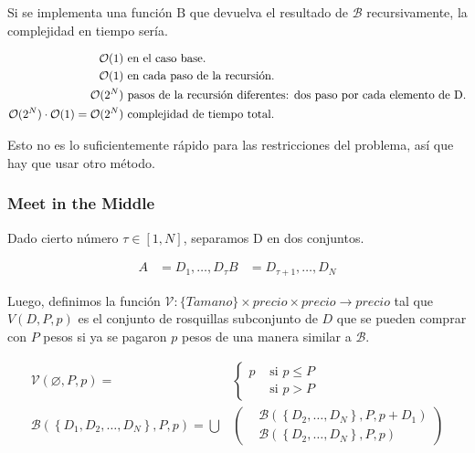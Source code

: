 Si se implementa una función \( \mathrm{B} \) que devuelva el resultado de \( \mathcal{B} \) recursivamente, la complejidad en tiempo sería.

\begin{align*}
	\mathcal{O}(1) & \text{ en el caso base.} \\
	\mathcal{O}(1) & \text{ en cada paso de la recursión.} \\
	\mathcal{O}(2^N) & \text{ pasos de la recursión diferentes: dos paso por cada elemento de D.} \\
	\mathcal{O}(2^N) \cdot \mathcal{O}(1) = \mathcal{O}(2^N) & \text{ complejidad de tiempo total.}
\end{align*}

Esto no es lo suficientemente rápido para las restricciones del problema, así que hay que usar otro método.

\subsubsection{Meet in the Middle}

Dado cierto número \( \tau \in \left[ 1, N\right ] \), separamos D en dos conjuntos.

\begin{align*}
	A &= D_1, \ldots, D_\tau
	B &= D_{\tau + 1}, \ldots, D_N
\end{align*}

Luego, definimos la función \( \mathcal{V} : \{Tamano\} \times precio \times precio \rightarrow {precio} \) tal que \( V(D, P, p) \) es el conjunto de rosquillas subconjunto de \( D \) que se pueden comprar con \( P \) pesos si ya se pagaron \( p \) pesos de una manera similar a \( \mathcal{B} \).

\begin{align*}
\mathcal{V} (\varnothing, P, p) =
	&\begin{cases}
		{p} & \text{ si \(p \leq P\)} \\
		{} & \text{ si \(p > P\)}
	\end{cases} \\
\mathcal{B} \left( \left\{ D_1, D_2, \ldots, D_N \right\}, P, p \right) = \bigcup &\left(
	\begin{aligned}
		&\mathcal{B} \left( \left\{ D_2, \ldots, D_N \right\}, P, p + D_1 \right) \\
		&\mathcal{B} \left( \left\{ D_2, \ldots, D_N \right\}, P, p \right)
	\end{aligned}
	\right)
\end{align*}
